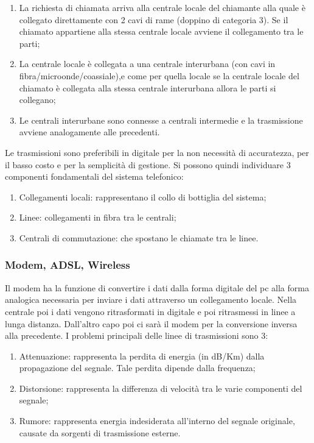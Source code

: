 \begin{enumerate}

\item{La richiesta di chiamata arriva alla centrale locale del chiamante alla quale è collegato direttamente con 2 cavi di rame (doppino di categoria 3). Se il chiamato appartiene alla stessa centrale locale avviene il collegamento tra le parti};
\item{La centrale locale è collegata a una centrale interurbana (con cavi in fibra/microonde/coassiale),e come per quella locale se la centrale locale del chiamato è collegata alla stessa centrale interurbana allora le parti si collegano};
\item{Le centrali interurbane sono connesse a centrali intermedie e la trasmissione avviene analogamente alle precedenti}.

\end{enumerate}

Le trasmissioni sono preferibili in digitale per la non necessità di accuratezza, per il basso costo e per la semplicità di gestione.
Si possono quindi individuare 3 componenti fondamentali del sistema telefonico:

\begin{enumerate}

\item{Collegamenti locali: rappresentano il collo di bottiglia del sistema};
\item{Linee: collegamenti in fibra tra le centrali};
\item{Centrali di commutazione: che spostano le chiamate tra le linee}.

\end{enumerate}

\subsubsection{Modem, ADSL, Wireless}

Il modem ha la funzione di convertire i dati dalla forma digitale del pc alla forma analogica necessaria per inviare i dati attraverso un collegamento locale. Nella centrale poi i dati vengono ritrasformati in digitale e poi ritrasmessi in linee a lunga distanza. Dall'altro capo poi ci sarà il modem per la conversione inversa alla precedente. I problemi principali delle linee di trasmissioni sono 3:

\begin{enumerate}

\item{Attenuazione: rappresenta la perdita di energia (in dB/Km) dalla propagazione del segnale. Tale perdita dipende dalla frequenza};
\item{Distorsione: rappresenta la differenza di velocità tra le varie componenti del segnale};
\item{Rumore: rappresenta energia indesiderata all'interno del segnale originale, causate da sorgenti di trasmissione esterne}.

\end{enumerate}

